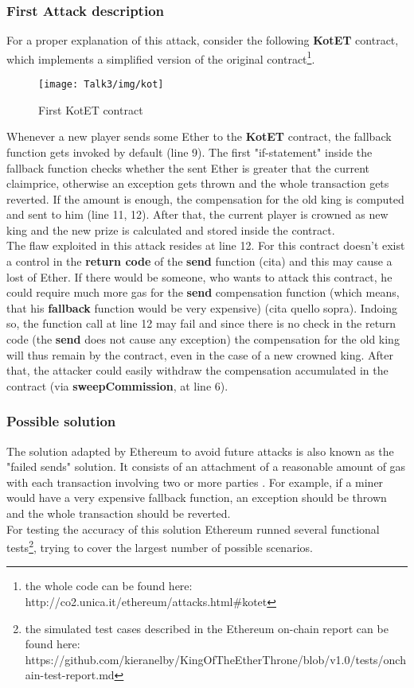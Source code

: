 \subsubsection{First Attack description}
For a proper explanation of this attack, consider the following \textbf{KotET} contract, which implements a simplified version of the original contract\footnote{the whole code can be found here: http://co2.unica.it/ethereum/attacks.html\#kotet}.   
\begin{figure}[H]
\begin{center}
\texttt{[image: Talk3/img/kot]}
\end{center}
\caption{First KotET contract}
\label{label}
\end{figure}
Whenever a new player sends some Ether to the \textbf{KotET} contract, the fallback function gets invoked by default (line 9). The first "if-statement" inside the fallback function checks whether the sent Ether is greater that the current claimprice, otherwise an exception gets thrown and the whole transaction gets reverted. If the amount is enough, the compensation for the old king is computed and sent to him (line 11, 12). After that, the current player is crowned as new king and the new prize is calculated and stored inside the contract\cite{paper2}. \\
The flaw exploited in this attack resides at line 12. For this contract doesn't exist a control in the \textbf{return code} of the \textbf{send} function (cita) %
and this may cause a lost of Ether.
If there would be someone, who wants to attack this contract, he could require much more gas for the \textbf{send} compensation function (which means, that his \textbf{fallback} function would be very expensive) (cita quello sopra). Indoing so, the function call at line 12 may fail and since there is no check in the return code (the \textbf{send} does not cause any exception) the compensation for the old king will thus remain by the contract, even in the case of a new crowned king. 
After that, the attacker could easily withdraw the compensation accumulated in the contract (via \textbf{sweepCommission}, at line 6).  

\subsubsection{Possible solution}
The solution adapted by Ethereum to avoid future attacks is also known as the "failed sends" solution. It consists of an attachment of a reasonable amount of gas with each transaction involving two or more parties \cite{koetXD}. 
For example, if a miner would have a very expensive fallback function, an exception should be thrown and the whole transaction should be reverted. \\ For testing the accuracy of this solution Ethereum runned several functional tests\footnote{the simulated test cases described in the Ethereum on-chain report can be found here: https://github.com/kieranelby/KingOfTheEtherThrone/blob/v1.0/tests/onchain-test-report.md}, trying to cover the largest number of possible scenarios. 



